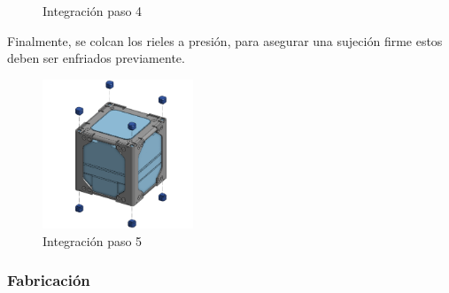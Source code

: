 \begin{figure}[H]
\begin{minipage}{0.49\textwidth}
          \caption{Integración paso 4}
          \label{fig:integracion4}
        \end{minipage}
      \end{figure}

      Finalmente, se colcan los rieles a presión, para asegurar una sujeción firme
      estos deben ser enfriados previamente.
      \begin{figure}[H]
        \centering
        \includegraphics[width=0.4\textwidth]{image/structure/integracion5.png}
        \caption{Integración paso 5}
        \label{fig:integracion5}
      \end{figure}

    \subsubsection{Fabricación}

